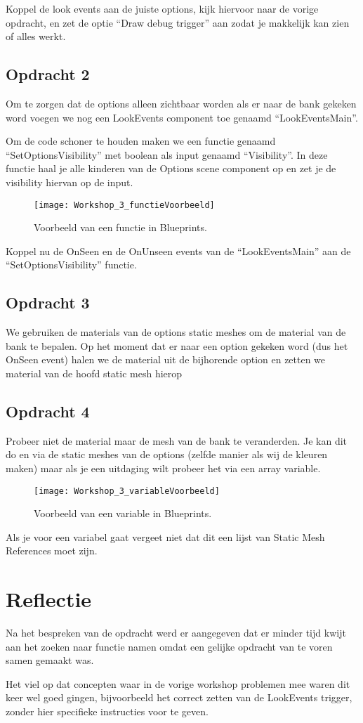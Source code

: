 Koppel de look events aan de juiste options, kijk hiervoor naar de vorige opdracht, en zet de optie  “Draw debug trigger” aan zodat je makkelijk kan zien of alles werkt.

\subsection{Opdracht 2}
Om te zorgen dat de options alleen zichtbaar worden als er naar de bank gekeken word voegen we nog een LookEvents component toe genaamd “LookEventsMain”. 

Om de code schoner te houden maken we een functie genaamd “SetOptionsVisibility” met boolean als input genaamd “Visibility”. In deze functie haal je alle kinderen van de Options scene component op en zet je de visibility hiervan op de input.

\begin{figure}[!ht]
  \centering
    \texttt{[image: Workshop\_3\_functieVoorbeeld]}
    \caption{Voorbeeld van een functie in Blueprints.}
\end{figure}

Koppel nu de OnSeen en de OnUnseen events van de “LookEventsMain” aan de “SetOptionsVisibility” functie.

\subsection{Opdracht 3}
We gebruiken de materials van de options static meshes om de material van de bank te bepalen. Op het moment dat er naar een option gekeken word (dus het OnSeen event) halen we de material uit de bijhorende option en zetten we material van de hoofd static mesh hierop

\subsection{Opdracht 4}
Probeer niet de material maar de mesh van de bank te veranderden. Je kan dit do en via de static meshes van de options (zelfde manier als wij de kleuren maken) maar als je een uitdaging wilt probeer het via een array variable.

\begin{figure}[!ht]
  \centering
    \texttt{[image: Workshop\_3\_variableVoorbeeld]}
    \caption{Voorbeeld van een variable in Blueprints.}
\end{figure}

Als je voor een variabel gaat vergeet niet dat dit een lijst van Static Mesh References moet zijn.

\section{Reflectie}
Na het bespreken van de opdracht werd er aangegeven dat er minder tijd kwijt aan het zoeken naar functie namen omdat een gelijke opdracht van te voren samen gemaakt was. 

Het viel op dat concepten waar in de vorige workshop problemen mee waren dit keer wel goed gingen, bijvoorbeeld het correct zetten van de LookEvents trigger, zonder hier specifieke instructies voor te geven.